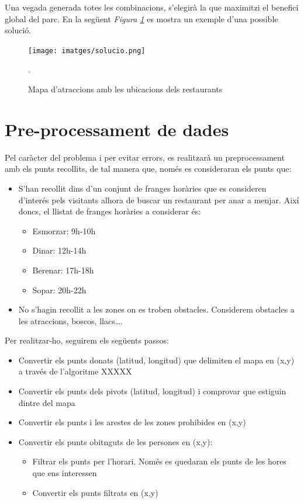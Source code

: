 \documentclass[12pt]{article}
\begin{document}
Una vegada generada totes les combinacions, s'elegirà la que maximitzi el benefici global del parc. En la següent \textit{Figura \ref{fig:mapa_restaurants}} es mostra un exemple d'una possible solució.

\begin{figure}[H]
	\centering
	\texttt{[image: imatges/solucio.png]}\par\vspace{1cm}
	\caption{Mapa d'atraccions amb les ubicacions dels restaurants}.
	\label{fig:mapa_restaurants}
\end{figure}


\section{Pre-processament de dades\label{pd}}
Pel caràcter del problema i per evitar errors, es realitzarà un preprocessament amb els punts recollits, de tal manera que, només es consideraran els punts que:
\begin{itemize}
	\item S’han recollit dins d’un conjunt de franges horàries que es consideren d'interés pels visitants alhora de buscar un restaurant per anar a menjar. 
	Així doncs, el llistat de franges horàries a considerar és:
	\begin{itemize}
		\item Esmorzar: 9h-10h
		\item Dinar: 12h-14h
		\item Berenar: 17h-18h
		\item Sopar: 20h-22h
	\end{itemize}

	\item No s’hagin recollit a les zones on es troben obstacles. 
	Considerem obstacles a les atraccions, boscos, llacs….
\end{itemize}

Per realitzar-ho, seguirem els següents passos:
\begin{itemize}
	\item Convertir els punts donats (latitud, longitud) que delimiten el mapa en (x,y) a través de l'algoritme XXXXX
	\item Convertir els punts dels pivots (latitud, longitud) i comprovar que estiguin dintre del mapa
	\item Convertir els punts i les arestes de les zones prohibides en (x,y)
	\item Convertir els punts obitnguts de les persones en (x,y):
	\begin{itemize}
		\item Filtrar els punts per l'horari. Només es quedaran els punts de les hores que ens interessen
		\item Convertir els punts filtrats en (x,y)
	\end{itemize}
	
\end{itemize}
\end{document}
